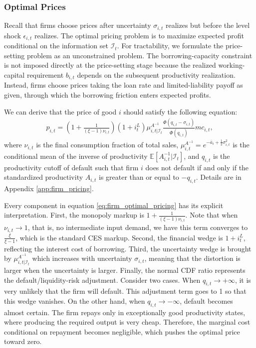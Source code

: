 \documentclass[12pt]{article}
\numberwithin{equation}{section}
\begin{document}
\subsubsection{Optimal Prices}
Recall that firms choose prices after uncertainty $\sigma_{i,t}$ realizes but before the level shock $\epsilon_{i,t}$ realizes. The optimal pricing problem is to maximize expected profit conditional on the information set $\mathcal I_t$. For tractability, we formulate the price-setting problem as an unconstrained problem. The borrowing-capacity constraint is not imposed directly at the price-setting stage because the realized working-capital requirement $b_{i,t}$ depends on the subsequent productivity realization. Instead, firms choose prices taking the loan rate and limited-liability payoff as given, through which the borrowing friction enters expected profits.

We can derive that the price of good $i$ should satisfy the following equation:
\begin{align}\label{eq:firm_optimal_pricing}
    p_{i,t} = \left(1+\frac{1}{(\xi-1)\nu_{i,t}}\right) (1+i^L_t) \mu^{A^{-1}}_{i,t|\mathcal{I}_t} \frac{\Phi(q_{i,t} - \sigma_{i,t})}{\Phi(q_{i,t})} {mc}_{i,t} ,
\end{align}
where $\nu_{i,t}$ is the final consumption fraction of total sales, $\mu^{A^{-1}}_{i,t} = e^{-\bar{a}_i + \frac12 \sigma_{i,t}^2}$ is the conditional mean of the inverse of productivity $\mathbb{E}\left[A^{-1}_{i,t} | \mathcal{I}_t\right]$, and $q_{i,t}$ is the productivity cutoff of default such that firm $i$ does not default if and only if the standardized productivity $A_{i,t}$ is greater than or equal to $-q_{i,t}$. Details are in Appendix \ref{app:firm_pricing}.

Every component in equation \eqref{eq:firm_optimal_pricing} has its explicit interpretation. First, the monopoly markup is $1 + \frac{1}{(\xi-1)\nu_{i,t}}$. Note that when $\nu_{i,t}\to 1$, that is, no intermediate input demand, we have this term converges to $\frac{\xi}{\xi-1}$, which is the standard CES markup. Second, the financial wedge is $1+ i^L_t$, reflecting the interest cost of borrowing. Third, the uncertainty wedge is brought by $\mu^{A^{-1}}_{i, t|\mathcal{I}_t}$ which increases with uncertainty $\sigma_{i,t}$, meaning that the distortion is larger when the uncertainty is larger. Finally, the normal CDF ratio represents the default/liquidity-risk adjustment. Consider two cases. When $q_{i,t} \to +\infty$, it is very unlikely that the firm will default. This adjustment term goes to 1 so that this wedge vanishes. On the other hand, when $q_{i,t} \to -\infty$, default becomes almost certain. The firm repays only in exceptionally good productivity states, where producing the required output is very cheap. Therefore, the marginal cost conditional on repayment becomes negligible, which pushes the optimal price toward zero.
\end{document}
